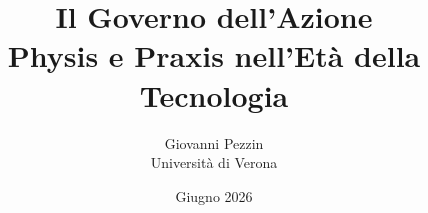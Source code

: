 \documentclass[11pt,a4paper]{report}
\title{\bfseries Il Governo dell'Azione \\[2pt]
\large Physis e Praxis nell'Et\`a della Tecnologia}
\author{Giovanni Pezzin \\[2pt]
\large Universit\`a di Verona}
\date{Giugno 2026}
\begin{document}
\maketitle

\begin{abstract}

\end{abstract}

\tableofcontents
















\appendix


\printbibliography
\end{document}
